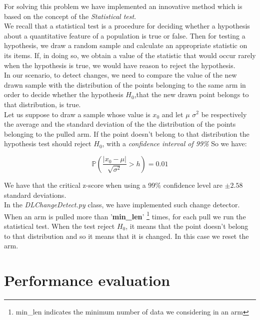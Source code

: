 For solving this problem we have implemented an innovative method which is based on the concept of the \textit{Statistical test}.\\
We recall that a statistical test is a procedure for deciding whether a hypothesis about a quantitative feature of a population is true or false. Then for testing a hypothesis, we draw a random sample and calculate an appropriate statistic on its items. If, in doing so, we obtain a value of the statistic that would occur rarely when the hypothesis is true, we would have reason to reject the hypothesis.\\
In our scenario, to detect changes, we need to compare the value of the new drawn sample with the distribution of the points belonging to the same arm in order to decide whether the hypothesis $H_0$,that the new drawn point belongs to that distribution, is true.\\
Let us suppose to draw a sample whose value is $x_0$ and let $\mu$ $\sigma^2$ be respectively the average
and the standard deviation of the the distribution of the points belonging to the pulled arm. 
If the point doesn't belong to that distribution the hypothesis test should reject $H_0$, with a \textit{confidence interval of 99\%} So we have:

\begin{equation}
	 \mathbb{P}\left(\frac{|x_0 - \mu|}{\sqrt{\sigma^2}} > h \right) = 0.01
\end{equation}

We have that the critical z-score when using a 99\% confidence level are $\pm 2.58$ standard deviations.\\

In the \textit{DLChangeDetect.py} class, we have implemented such change detector. When an arm is pulled more than '\textbf{min\_len}' \footnote{min\_len indicates the minimum number of data we considering in an arm} times, for each pull we run the statistical test. When the test reject $H_0$, it means that the point doesn't belong to that distribution and so it means that it is changed. In this case we reset the arm.\\ 

\section{Performance evaluation}

